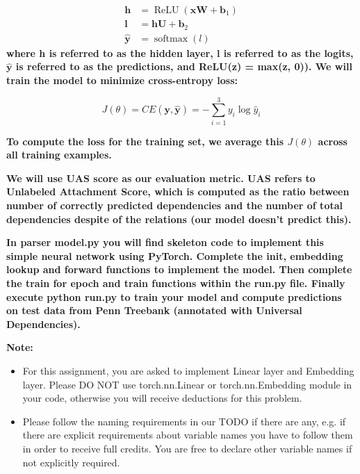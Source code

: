 \documentclass[a4 paper]{article}
\begin{document}
\begin{equation}
    \begin{aligned} \mathbf{h} &=\operatorname{ReLU}\left(\mathbf{x} \mathbf{W}+\mathbf{b}_{1}\right) \\ \mathbf{l} &=\mathbf{h} \mathbf{U}+\mathbf{b}_{2} \\ \hat{\mathbf{y}} &=\operatorname{softmax}(l) \end{aligned}
\end{equation}
\textbf{where h is referred to as the hidden layer, l is referred to as the logits, $\hat{\mathbf{y}}$ is referred to as the predictions, and ReLU(z) = max(z, 0)).
We will train the model to minimize cross-entropy loss:}

\begin{equation}
    J(\theta)=C E(\mathbf{y}, \hat{\mathbf{y}})=-\sum_{i=1}^{3} y_{i} \log \hat{y}_{i}
\end{equation}

\textbf{To compute the loss for the training set, we average this $J(\theta)$ across all training examples.}

\textbf{We will use UAS score as our evaluation metric.
UAS refers to Unlabeled Attachment Score, which is computed as the ratio between number of correctly predicted dependencies and the number of total dependencies despite of the relations (our model doesn’t predict this).}

\textbf{In parser model.py you will ﬁnd skeleton code to implement this simple neural network using PyTorch.
Complete the init, embedding lookup and forward functions to implement the model.
Then complete the train for epoch and train functions within the run.py ﬁle.
Finally execute python run.py to train your model and compute predictions on test data from Penn Treebank (annotated with Universal Dependencies).}

\textbf{Note:}

\begin{itemize}
    \item For this assignment, you are asked to implement Linear layer and Embedding layer.
    Please DO NOT use torch.nn.Linear or torch.nn.Embedding module in your code, otherwise you will receive deductions for this problem.
    \item Please follow the naming requirements in our TODO if there are any, e.g.
    if there are explicit requirements about variable names you have to follow them in order to receive full credits.
    You are free to declare other variable names if not explicitly required.
\end{itemize}
\end{document}

